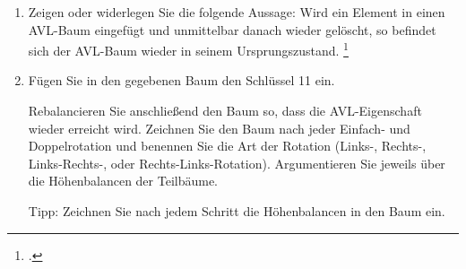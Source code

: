 \documentclass{bschlangaul-aufgabe}
\begin{document}
\begin{enumerate}


\item Zeigen oder widerlegen Sie die folgende Aussage: Wird ein Element
in einen AVL-Baum eingefügt und unmittelbar danach wieder gelöscht, so
befindet sich der AVL-Baum wieder in seinem
Ursprungszustand.
\footcite{examen:46115:2019:03}


\item Fügen Sie in den gegebenen Baum den Schlüssel 11 ein.

Rebalancieren Sie anschließend den Baum so, dass die AVL-Eigenschaft
wieder erreicht wird. Zeichnen Sie den Baum nach jeder Einfach- und
Doppelrotation und benennen Sie die Art der Rotation (Links-, Rechts-,
Links-Rechts-, oder Rechts-Links-Rotation). Argumentieren Sie jeweils
über die Höhenbalancen der Teilbäume.

Tipp: Zeichnen Sie nach jedem Schritt die Höhenbalancen in den Baum ein.
\end{enumerate}
\end{document}
